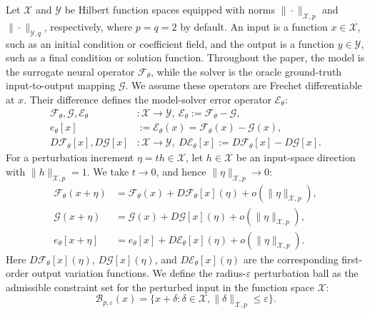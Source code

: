 ﻿\documentclass[letterpaper]{article} %
\begin{document}
Let $\mathcal{X}$ and $\mathcal{Y}$ be Hilbert function spaces equipped with
norms $\|\cdot\|_{\mathcal{X},p}$ and $\|\cdot\|_{\mathcal{Y},q}$, respectively,
where $p=q=2$ by default. An input is a function $x\in\mathcal{X}$, such as an
initial condition or coefficient field, and the output is a function
$y\in\mathcal{Y}$, such as a final condition or solution function. Throughout
the paper, the model is the surrogate neural
operator $\mathcal{F}_\theta$, while the solver is the oracle ground-truth
input-to-output mapping $\mathcal{G}$. We assume these operators are Frechet
differentiable at $x$. Their difference defines the
model-solver error operator $\mathcal{E}_\theta$:
\begin{equation*}
\begin{aligned}
  \mathcal{F}_\theta,\mathcal{G},\mathcal{E}_\theta
  &:\mathcal{X}\to\mathcal{Y},\
  \mathcal{E}_\theta:=\mathcal{F}_\theta-\mathcal{G},\\
  e_\theta[x]
  &:=
  \mathcal{E}_\theta(x)
  =
  \mathcal{F}_\theta(x)-\mathcal{G}(x),\\
  D\mathcal{F}_\theta[x],D\mathcal{G}[x]
  &:\mathcal{X}\to\mathcal{Y},\
  D\mathcal{E}_\theta[x]:=D\mathcal{F}_\theta[x]-D\mathcal{G}[x].
\end{aligned}
\end{equation*}
For a perturbation increment $\eta=t h\in\mathcal{X}$, let $h\in\mathcal{X}$ be an
input-space direction with $\|h\|_{\mathcal{X},p}=1$. We take $t\to0$, and hence
$\|\eta\|_{\mathcal{X},p}\to0$:
\begin{align*}
  \mathcal{F}_\theta(x+\eta)
  &=
  \mathcal{F}_\theta(x)+D\mathcal{F}_\theta[x](\eta)
  +o(\|\eta\|_{\mathcal{X},p}),
  \\
  \mathcal{G}(x+\eta)
  &=
  \mathcal{G}(x)+D\mathcal{G}[x](\eta)
  +o(\|\eta\|_{\mathcal{X},p}),
  \\
  e_\theta[x+\eta]
  &=
  e_\theta[x]+D\mathcal{E}_\theta[x](\eta)
  +o(\|\eta\|_{\mathcal{X},p}).
\end{align*}
Here $D\mathcal{F}_\theta[x](\eta)$, $D\mathcal{G}[x](\eta)$, and
$D\mathcal{E}_\theta[x](\eta)$ are the corresponding first-order output
variation functions.
We define the radius-$\varepsilon$ perturbation ball as the admissible
constraint set for the perturbed input in the function space $\mathcal{X}$:
\begin{equation*}
  \mathcal{B}_{p,\varepsilon}(x)
  =
  \{x+\delta:\delta\in\mathcal{X},
  \|\delta\|_{\mathcal{X},p}\le\varepsilon\}.
\end{equation*}
\end{document}
